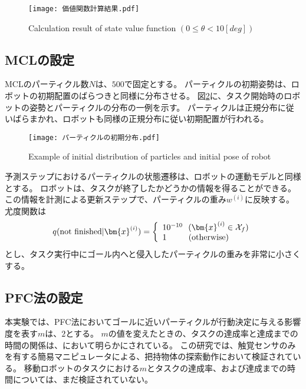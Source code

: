 \begin{figure}[H]
  \begin{center}
    \texttt{[image: 価値関数計算結果.pdf]}
    \caption{Calculation result of state value function $(0 \leq \theta < 10 \si{[deg]})$}
    \label{fig:価値関数計算結果}
  \end{center}
\end{figure}

\subsection{MCLの設定}
MCLのパーティクル数$N$は、$500$で固定とする。
パーティクルの初期姿勢は、ロボットの初期配置のばらつきと同様に分布させる。
図\ref{fig:パーティクルの初期分布}に、タスク開始時のロボットの姿勢とパーティクルの分布の一例を示す。
パーティクルは正規分布に従いばらまかれ、ロボットも同様の正規分布に従い初期配置が行われる。

\begin{figure}[H]
  \begin{center}
    \texttt{[image: パーティクルの初期分布.pdf]}
    \caption{Example of initial distribution of particles and initial pose of robot}
    \label{fig:パーティクルの初期分布}
  \end{center}
\end{figure}

予測ステップにおけるパーティクルの状態遷移は、ロボットの運動モデルと同様とする。
ロボットは、タスクが終了したかどうかの情報を得ることができる。
この情報を計測による更新ステップで、パーティクルの重み$w^{(i)}$に反映する。
尤度関数は
\begin{equation}
  q({\rm not \  finished} | \bm{x}^{(i)}) =
  \left\{
    \begin{array}{l}
      10^{-10} \ \ (\bm{x}^{(i)} \in \mathcal{X}_{f}) \\
      1 \quad \quad \ \ ({\rm otherwise})
    \end{array}
  \right.
\end{equation}
とし、タスク実行中にゴール内へと侵入したパーティクルの重みを非常に小さくする。

\subsection{PFC法の設定}
本実験では、PFC法においてゴールに近いパーティクルが行動決定に与える影響度を表す$m$は、$2$とする。
$m$の値を変えたときの、タスクの達成率と達成までの時間の関係は、\cite{ueda2018searching}において明らかにされている。
この研究では、触覚センサのみを有する簡易マニピュレータによる、把持物体の探索動作において検証されている。
移動ロボットのタスクにおける$m$とタスクの達成率、および達成までの時間については、まだ検証されていない。

